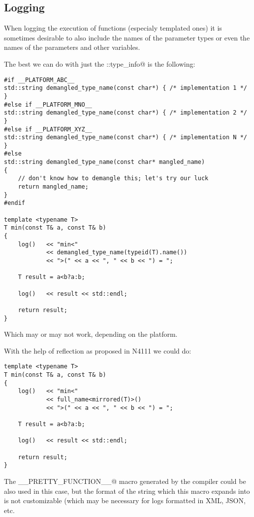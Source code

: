 \subsection{Logging}

When logging the execution of functions (especialy templated ones) it is sometimes
desirable to also include the names of the parameter types or even the names of the parameters
and other variables.

The best we can do with just the \verb@std::type_info@ is the following:

\begin{verbatim}
#if __PLATFORM_ABC__
std::string demangled_type_name(const char*) { /* implementation 1 */ }
#else if __PLATFORM_MNO__
std::string demangled_type_name(const char*) { /* implementation 2 */ }
#else if __PLATFORM_XYZ__
std::string demangled_type_name(const char*) { /* implementation N */ }
#else
std::string demangled_type_name(const char* mangled_name)
{
	// don't know how to demangle this; let's try our luck
	return mangled_name;
}
#endif

template <typename T>
T min(const T& a, const T& b)
{
	log()   << "min<"
	        << demangled_type_name(typeid(T).name())
	        << ">(" << a << ", " << b << ") = ";

	T result = a<b?a:b;

	log()   << result << std::endl;

	return result;
}

\end{verbatim}

Which may or may not work, depending on the platform.

With the help of reflection as proposed in N4111 we could do:

\begin{verbatim}
template <typename T>
T min(const T& a, const T& b)
{
	log()   << "min<"
	        << full_name<mirrored(T)>()
	        << ">(" << a << ", " << b << ") = ";

	T result = a<b?a:b;

	log()   << result << std::endl;

	return result;
}
\end{verbatim}

The \verb@__PRETTY_FUNCTION__@ macro generated by the compiler could be also
used in this case, but the format of the string which this macro expands into is not customizable
(which may be necessary for logs formatted in XML, JSON, etc.

